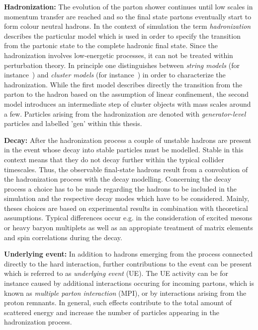 \begin{description}
 \item \textbf{Hadronization:} The evolution of the parton shower continues until low scales in momentum transfer are reached and so the final state partons eventually start to form colour neutral hadrons. In the context of simulation the term \textit{hadronization} describes the particular model which is used in order to specify the transition from the partonic state to the complete hadronic final state. Since the hadronization involves low-energetic processes, it can not be treated within perturbation theory. In principle one distinguishes between \textit{string models} (\cf for instance~\cite{Andersson198331}) and \textit{cluster models} (\cf for instance~\cite{Amati197987, Bassetto1979207}) in order to characterize the hadronization. While the first model describes directly the transition from the parton to the hadron based on the assumption of linear confinement, the second model introduces an intermediate step of cluster objects with mass scales around a few\gev. Particles arising from the hadronization are denoted with \textit{generator-level} particles and labelled 'gen' within this thesis.
 \item \textbf{Decay:} After the hadronization process a couple of unstable hadrons are present in the event whose decay into stable particles must be modelled. Stable in this context means that they do not decay further within the typical collider timescales. Thus, the observable final-state hadrons result from a convolution of the hadronization process with the decay modelling. Concerning the decay process a choice has to be made regarding the hadrons to be included in the simulation and the respective decay modes which have to be considered. Mainly, theses choices are based on experimental results in combination with theoretical assumptions. Typical differences occur e.g. in the consideration of excited mesons or heavy baryon multiplets as well as an appropiate treatment of matrix elements and spin correlations during the decay. 
 \item \textbf{Underlying event:} In addition to hadrons emerging from the process connected directly to the hard interaction, further contributions to the event can be present which is referred to as \textit{underlying event} (UE). The UE activity can be for instance caused by additional interactions occuring for incoming partons, which is known as \textit{multiple parton interaction} (MPI), or by interactions arising from the proton remnants. In general, such effects contribute to the total amount of scattered energy and increase the number of particles appearing in the hadronization process. 
\end{description}
